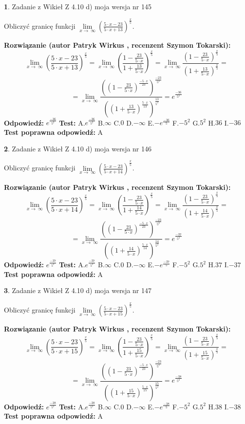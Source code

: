 \documentclass[12pt, a4paper]{article}
\theoremstyle{definition} %
\newtheorem{zad}{}
\newcommand{\zadStart}[1]{\begin{zad}#1\newline}
\newcommand{\zadStop}{\end{zad}}
\newcommand{\rozwStart}[2]{\noindent \textbf{Rozwiązanie (autor #1 , recenzent #2): }\newline}
\newcommand{\rozwStop}{\newline}
\newcommand{\odpStart}{\noindent \textbf{Odpowiedź:}\newline}
\newcommand{\odpStop}{\newline}
\newcommand{\testStart}{\noindent \textbf{Test:}\newline}
\newcommand{\testStop}{\newline}
\newcommand{\kluczStart}{\noindent \textbf{Test poprawna odpowiedź:}\newline}
\newcommand{\kluczStop}{\newline}
\begin{document}
\zadStart{Zadanie z Wikieł Z 4.10 d) moja wersja nr 145}


Obliczyć granicę funkcji  $\lim\limits_{x\to\ \infty}(\frac{5\cdot x-23}{5\cdot x+13})^{\frac{x}{5}}$.
\zadStop
\rozwStart{Patryk Wirkus}{Szymon Tokarski}
$$\lim\limits_{x\to\ \infty}(\frac{5\cdot x-23}{5\cdot x+13})^{\frac{x}{5}} = \lim\limits_{x\to\ \infty}(\frac{1-\frac{23}{5\cdot x}}{1+\frac{13}{5\cdot x}})^{\frac{x}{5}}=\lim\limits_{x\to\ \infty}\frac{(1-\frac{23}{5\cdot x})^{\frac{x}{5}}}{(1+\frac{13}{5\cdot x})^{\frac{x}{5}}}=$$
$$=\lim\limits_{x\to\ \infty}\frac{((1-\frac{23}{5\cdot x})^{\frac{-5\cdot x}{23}})^{\frac{-23}{5^{2}}}}{((1+\frac{13}{5\cdot x})^{\frac{5\cdot x}{13}})^{\frac{13}{5^{2}}}}=e^{\frac{-36}{5^{2}}}$$
\rozwStop
\odpStart
$e^{\frac{-36}{5^{2}}}$
\odpStop
\testStart
A.$e^{\frac{-36}{5^{2}}}$ B.$\infty$ C.$0$ D.$-\infty$ E.$-e^{\frac{-36}{5}}$
F.$-5^{2}$ G.$5^{2}$
H.$36$
I.$-36$
\testStop
\kluczStart
A
\kluczStop



\zadStart{Zadanie z Wikieł Z 4.10 d) moja wersja nr 146}


Obliczyć granicę funkcji  $\lim\limits_{x\to\ \infty}(\frac{5\cdot x-23}{5\cdot x+14})^{\frac{x}{5}}$.
\zadStop
\rozwStart{Patryk Wirkus}{Szymon Tokarski}
$$\lim\limits_{x\to\ \infty}(\frac{5\cdot x-23}{5\cdot x+14})^{\frac{x}{5}} = \lim\limits_{x\to\ \infty}(\frac{1-\frac{23}{5\cdot x}}{1+\frac{14}{5\cdot x}})^{\frac{x}{5}}=\lim\limits_{x\to\ \infty}\frac{(1-\frac{23}{5\cdot x})^{\frac{x}{5}}}{(1+\frac{14}{5\cdot x})^{\frac{x}{5}}}=$$
$$=\lim\limits_{x\to\ \infty}\frac{((1-\frac{23}{5\cdot x})^{\frac{-5\cdot x}{23}})^{\frac{-23}{5^{2}}}}{((1+\frac{14}{5\cdot x})^{\frac{5\cdot x}{14}})^{\frac{14}{5^{2}}}}=e^{\frac{-37}{5^{2}}}$$
\rozwStop
\odpStart
$e^{\frac{-37}{5^{2}}}$
\odpStop
\testStart
A.$e^{\frac{-37}{5^{2}}}$ B.$\infty$ C.$0$ D.$-\infty$ E.$-e^{\frac{-37}{5}}$
F.$-5^{2}$ G.$5^{2}$
H.$37$
I.$-37$
\testStop
\kluczStart
A
\kluczStop



\zadStart{Zadanie z Wikieł Z 4.10 d) moja wersja nr 147}


Obliczyć granicę funkcji  $\lim\limits_{x\to\ \infty}(\frac{5\cdot x-23}{5\cdot x+15})^{\frac{x}{5}}$.
\zadStop
\rozwStart{Patryk Wirkus}{Szymon Tokarski}
$$\lim\limits_{x\to\ \infty}(\frac{5\cdot x-23}{5\cdot x+15})^{\frac{x}{5}} = \lim\limits_{x\to\ \infty}(\frac{1-\frac{23}{5\cdot x}}{1+\frac{15}{5\cdot x}})^{\frac{x}{5}}=\lim\limits_{x\to\ \infty}\frac{(1-\frac{23}{5\cdot x})^{\frac{x}{5}}}{(1+\frac{15}{5\cdot x})^{\frac{x}{5}}}=$$
$$=\lim\limits_{x\to\ \infty}\frac{((1-\frac{23}{5\cdot x})^{\frac{-5\cdot x}{23}})^{\frac{-23}{5^{2}}}}{((1+\frac{15}{5\cdot x})^{\frac{5\cdot x}{15}})^{\frac{15}{5^{2}}}}=e^{\frac{-38}{5^{2}}}$$
\rozwStop
\odpStart
$e^{\frac{-38}{5^{2}}}$
\odpStop
\testStart
A.$e^{\frac{-38}{5^{2}}}$ B.$\infty$ C.$0$ D.$-\infty$ E.$-e^{\frac{-38}{5}}$
F.$-5^{2}$ G.$5^{2}$
H.$38$
I.$-38$
\testStop
\kluczStart
A
\kluczStop
\end{document}
